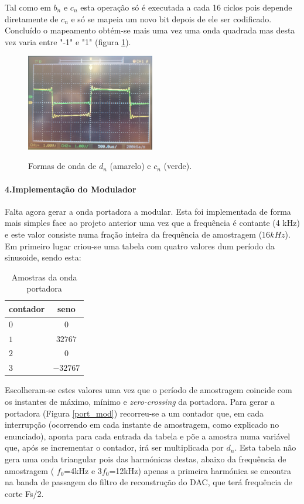 \documentclass[11pt]{article}
\numberwithin{equation}{section}
\begin{document}
Tal como em $b_n$ e $c_n$ esta operação só é executada a cada 16 ciclos pois depende diretamente de $c_n$ e só se mapeia um novo bit depois de ele ser codificado. Concluído o mapeamento obtém-se mais uma vez uma onda quadrada mas desta vez varia entre "-1" e "1" (figura \ref{cn_dn}).
\begin{figure}[H]
	\centering
	\includegraphics[width=0.5\textwidth]{./cn_dn}~\\
	\caption{Formas de onda de $d_n$ (amarelo) e $c_n$ (verde).}
	\label{cn_dn}
\end{figure}

\paragraph{4.Implementação do Modulador} \hspace{0pt}

Falta agora gerar a onda portadora a modular. Esta foi implementada de forma mais simples face ao projeto anterior uma vez que a frequência é contante (4 kHz) e este valor consiste numa fração inteira da frequência de amostragem ($16 kHz$).
Em primeiro lugar criou-se uma tabela com quatro valores dum período da sinusoide, sendo esta:
\begin{table}[H]
	\centering
	\caption{Amostras da onda portadora}
	\label{tab:amostras}
	\begin{tabular}[c]{|l||c|}
		\hline \textbf{contador} & \textbf{seno}\\ 
		\hline $ 0 $ & $ 0 $\\ 
		\hline $ 1 $ & $ 32767 $  \\ 
		\hline $ 2 $ & $ 0 $ \\ 
		\hline $ 3 $ & $ -32767 $ \\
		\hline
	\end{tabular}
\end{table}


Escolheram-se estes valores uma vez que o período de amostragem coincide com os instantes de máximo, mínimo e \textit{zero-crossing} da portadora. Para gerar a portadora (Figura \ref{port_mod}) recorreu-se a um contador que, em cada interrupção (ocorrendo em cada instante de amostragem, como explicado no enunciado), aponta para cada entrada da tabela e põe a amostra numa variável que, após se incrementar o contador, irá ser multiplicada por $d_n$. Esta tabela não gera uma onda triangular pois das harmónicas destas, abaixo da frequência de amostragem ( $f_0$=4kHz e 3$f_0$=12kHz) apenas a primeira harmónica se encontra na banda de passagem do filtro de reconstrução do DAC, que terá frequência de corte Fs/2.
\end{document}
